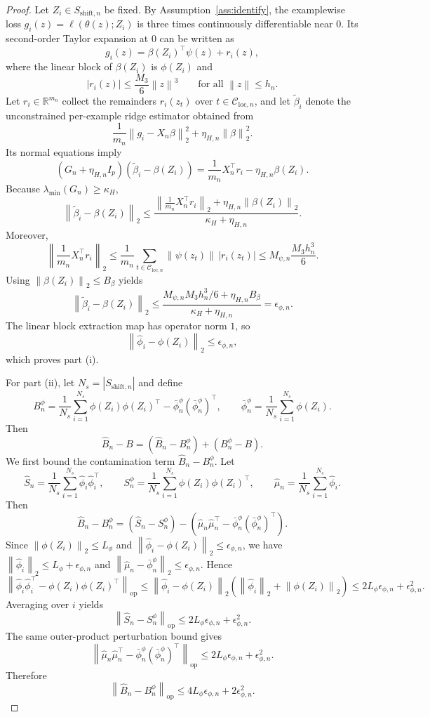 \documentclass{article}
\newcommand{\RR}{\mathbb{R}}
\newcommand{\cC}{\mathcal{C}}
\newcommand{\loss}{\ell}
\newcommand{\norm}[1]{\left\lVert #1 \right\rVert}
\newcommand{\abs}[1]{\left\lvert #1 \right\rvert}
\newcommand{\paren}[1]{\left( #1 \right)}
\begin{document}
\begin{proof}
Let \(Z_i\in S_{\mathrm{shift},n}\) be fixed. By Assumption~\ref{ass:identify}, the examplewise loss \(g_i(z)=\loss(\theta(z);Z_i)\) is three times continuously differentiable near \(0\). Its second-order Taylor expansion at \(0\) can be written as
\[
g_i(z)=\beta(Z_i)^\top \psi(z) + r_i(z),
\]
where the linear block of \(\beta(Z_i)\) is \(\phi(Z_i)\) and
\[
\abs{r_i(z)}
\le
\frac{M_3}{6}\norm{z}^3
\qquad
\text{for all } \norm{z}\le h_n.
\]
Let \(r_i\in\RR^{m_n}\) collect the remainders \(r_i(z_t)\) over \(t\in\cC_{\mathrm{loc},n}\), and let \(\tilde\beta_i\) denote the unconstrained per-example ridge estimator obtained from
\[
\frac{1}{m_n}\norm{g_i - X_n\beta}_2^2 + \eta_{H,n}\norm{\beta}_2^2.
\]
Its normal equations imply
\[
(G_n+\eta_{H,n}I_p)(\tilde\beta_i-\beta(Z_i))
=
\frac{1}{m_n}X_n^\top r_i - \eta_{H,n}\beta(Z_i).
\]
Because \(\lambda_{\min}(G_n)\ge \kappa_H\),
\[
\norm{\tilde\beta_i-\beta(Z_i)}_2
\le
\frac{
\norm{\frac{1}{m_n}X_n^\top r_i}_2 + \eta_{H,n}\norm{\beta(Z_i)}_2
}{\kappa_H+\eta_{H,n}}.
\]
Moreover,
\[
\norm{\frac{1}{m_n}X_n^\top r_i}_2
\le
\frac{1}{m_n}\sum_{t\in\cC_{\mathrm{loc},n}} \norm{\psi(z_t)}\,\abs{r_i(z_t)}
\le
M_{\psi,n}\frac{M_3 h_n^3}{6}.
\]
Using \(\norm{\beta(Z_i)}_2\le B_\beta\) yields
\[
\norm{\tilde\beta_i-\beta(Z_i)}_2
\le
\frac{M_{\psi,n}M_3 h_n^3/6 + \eta_{H,n}B_\beta}{\kappa_H+\eta_{H,n}}
=
\epsilon_{\phi,n}.
\]
The linear block extraction map has operator norm \(1\), so
\[
\norm{\hat\phi_i-\phi(Z_i)}_2 \le \epsilon_{\phi,n},
\]
which proves part (i).

For part (ii), let \(N_s=\abs{S_{\mathrm{shift},n}}\) and define
\[
B_n^\phi
=
\frac{1}{N_s}\sum_{i=1}^{N_s}\phi(Z_i)\phi(Z_i)^\top
-
\bar\phi_n^\phi(\bar\phi_n^\phi)^\top,
\qquad
\bar\phi_n^\phi=\frac{1}{N_s}\sum_{i=1}^{N_s}\phi(Z_i).
\]
Then
\[
\hat B_n-B
=
(\hat B_n-B_n^\phi) + (B_n^\phi-B).
\]
We first bound the contamination term \(\hat B_n-B_n^\phi\). Let
\[
\hat S_n=\frac{1}{N_s}\sum_{i=1}^{N_s}\hat\phi_i\hat\phi_i^\top,
\qquad
S_n^\phi=\frac{1}{N_s}\sum_{i=1}^{N_s}\phi(Z_i)\phi(Z_i)^\top,
\qquad
\hat\mu_n=\frac{1}{N_s}\sum_{i=1}^{N_s}\hat\phi_i.
\]
Then
\[
\hat B_n-B_n^\phi
=
(\hat S_n-S_n^\phi) - (\hat\mu_n\hat\mu_n^\top - \bar\phi_n^\phi(\bar\phi_n^\phi)^\top).
\]
Since \(\norm{\phi(Z_i)}_2\le L_\phi\) and \(\norm{\hat\phi_i-\phi(Z_i)}_2\le \epsilon_{\phi,n}\), we have \(\norm{\hat\phi_i}_2\le L_\phi+\epsilon_{\phi,n}\) and \(\norm{\hat\mu_n-\bar\phi_n^\phi}_2\le \epsilon_{\phi,n}\). Hence
\[
\norm{\hat\phi_i\hat\phi_i^\top - \phi(Z_i)\phi(Z_i)^\top}_{\mathrm{op}}
\le
\norm{\hat\phi_i-\phi(Z_i)}_2\paren{\norm{\hat\phi_i}_2+\norm{\phi(Z_i)}_2}
\le
2L_\phi\epsilon_{\phi,n} + \epsilon_{\phi,n}^2.
\]
Averaging over \(i\) yields
\[
\norm{\hat S_n-S_n^\phi}_{\mathrm{op}}
\le
2L_\phi\epsilon_{\phi,n} + \epsilon_{\phi,n}^2.
\]
The same outer-product perturbation bound gives
\[
\norm{\hat\mu_n\hat\mu_n^\top - \bar\phi_n^\phi(\bar\phi_n^\phi)^\top}_{\mathrm{op}}
\le
2L_\phi\epsilon_{\phi,n} + \epsilon_{\phi,n}^2.
\]
Therefore
\[
\norm{\hat B_n-B_n^\phi}_{\mathrm{op}}
\le
4L_\phi\epsilon_{\phi,n} + 2\epsilon_{\phi,n}^2.
\]


\end{proof}
\end{document}
